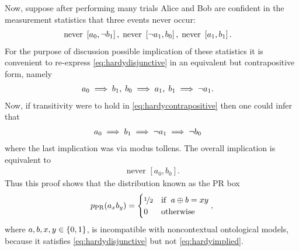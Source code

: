 Now, suppose after performing many trials Alice and Bob are confident in the measurement statistics that three events never occur:
\begin{align}\begin{split}\label{eq:hardydisjunctive}
\text{never }& \left[a_0,\lnot b_1\right],
\; \text{never } \left[\lnot a_1,b_0\right],
\; \text{never } \left[a_1, b_1\right].
\end{split}\end{align}
For the purpose of discussion possible implication of these statistics it is convenient to re-express \cref{eq:hardydisjunctive} in an equivalent but contrapositive form, namely 
\begin{align}\begin{split}\label{eq:hardycontrapositive}
a_0 &\implies b_1,
\; b_0 \implies a_1,
\; b_1 \implies \lnot a_1.
\end{split}\end{align}
Now, if transitivity were to hold in \cref{eq:hardycontrapositive} then one could infer that 
\begin{align}\label{eq:hardyimplication}
a_0 &\implies b_1 \implies \lnot a_1 \implies \lnot b_0
\end{align}
where the last implication was via modus tollens. The overall implication is equivalent to
\begin{align}\label{eq:hardyimplied}
\text{ never }\left[a_0,b_0\right].
\end{align}
Thus this proof shows that the distribution known as the PR box~\cite{PROriginal,PRUnit}
\begin{align}\label{eq:PRbox}
p_{\text{PR}}(a_x b_y)=\begin{cases}\nicefrac{1}{2}&\text{if }\; a\oplus b= x y \\ 0&\text{otherwise}\end{cases},
\end{align}
where $a,b,x,y\in\lbrace{0,1\rbrace}$,
is incompatible with noncontextual ontological models, because it satisfies \cref{eq:hardydisjunctive} but not \cref{eq:hardyimplied}. 

